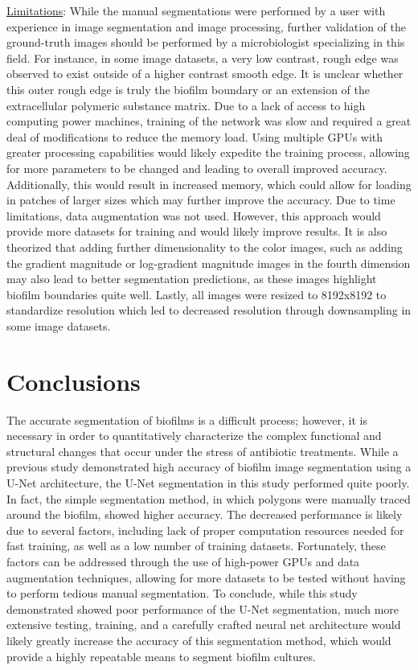 \documentclass[conference]{IEEEtran}
\begin{document}
\ul{Limitations}: While the manual segmentations were performed by a user with experience in image segmentation and image processing, further validation of the ground-truth images should be performed by a microbiologist specializing in this field. For instance, in some image datasets, a very low contrast, rough edge was observed to exist outside of a higher contrast smooth edge. It is unclear whether this outer rough edge is truly the biofilm boundary or an extension of the extracellular polymeric substance matrix. Due to a lack of access to high computing power machines, training of the network was slow and required a great deal of modifications to reduce the memory load. Using multiple GPUs with greater processing capabilities would likely expedite the training process, allowing for more parameters to be changed and leading to overall improved accuracy. Additionally, this would result in increased memory, which could allow for loading in patches of larger sizes which may further improve the accuracy. Due to time limitations, data augmentation was not used. However, this approach would provide more datasets for training and would likely improve results. It is also theorized that adding further dimensionality to the color images, such as adding the gradient magnitude or log-gradient magnitude images in the fourth dimension may also lead to better segmentation predictions, as these images highlight biofilm boundaries quite well. Lastly, all images were resized to 8192x8192 to standardize resolution which led to decreased resolution through downsampling in some image datasets. 


\section{Conclusions}
The accurate segmentation of biofilms is a difficult process; however, it is necessary in order to quantitatively characterize the complex functional and structural changes that occur under the stress of antibiotic treatments. While a previous study demonstrated high accuracy of biofilm image segmentation using a U-Net architecture, the U-Net segmentation in this study performed quite poorly. In fact, the simple segmentation method, in which polygons were manually traced around the biofilm, showed higher accuracy. The decreased performance is likely due to several factors, including lack of proper computation resources needed for fast training, as well as a low number of training datasets. Fortunately, these factors can be addressed through the use of high-power GPUs and data augmentation techniques, allowing for more datasets to be tested without having to perform tedious manual segmentation. To conclude, while this study demonstrated showed poor performance of the U-Net segmentation, much more extensive testing, training, and a carefully crafted neural net architecture would likely greatly increase the accuracy of this segmentation method, which would provide a highly repeatable means to segment biofilm cultures. 
\end{document}
